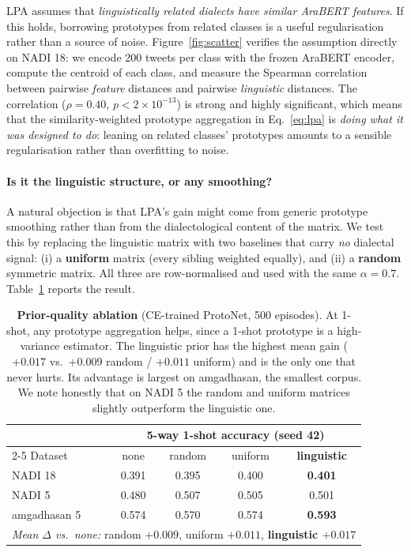 \documentclass[11pt,a4paper,twocolumn]{article}
\begin{document}
LPA assumes that \emph{linguistically related dialects have
similar AraBERT features}. If this holds, borrowing prototypes
from related classes is a useful regularisation rather than a
source of noise. Figure~\ref{fig:scatter} verifies the
assumption directly on NADI 18: we encode 200 tweets per class
with the frozen AraBERT encoder, compute the centroid of each
class, and measure the Spearman correlation between pairwise
\emph{feature} distances and pairwise \emph{linguistic}
distances. The correlation ($\rho{=}0.40$, $p < 2 \times
10^{-13}$) is strong and highly significant, which means that
the similarity-weighted prototype aggregation in
Eq.~\ref{eq:lpa} is \emph{doing what it was designed to do}:
leaning on related classes' prototypes amounts to a sensible
regularisation rather than overfitting to noise.

\paragraph{Is it the linguistic structure, or any smoothing?}
A natural objection is that LPA's gain might come from generic
prototype smoothing rather than from the dialectological
content of the matrix. We test this by replacing the linguistic
matrix with two baselines that carry \emph{no} dialectal
signal: (i) a \textbf{uniform} matrix (every sibling weighted
equally), and (ii) a \textbf{random} symmetric matrix. All
three are row-normalised and used with the same $\alpha{=}0.7$.
Table~\ref{tab:prior} reports the result.

\begin{table}[t]
\centering\small
\begin{tabular}{lcccc}
\toprule
& \multicolumn{4}{c}{5-way 1-shot accuracy (seed 42)} \\
\cmidrule(lr){2-5}
Dataset & none & random & uniform & \textbf{linguistic} \\
\midrule
NADI 18        & 0.391 & 0.395 & 0.400 & \textbf{0.401} \\
NADI 5         & 0.480 & 0.507 & 0.505 & 0.501 \\
amgadhasan 5   & 0.574 & 0.570 & 0.574 & \textbf{0.593} \\
\midrule
\multicolumn{5}{l}{\emph{Mean $\Delta$ vs.\ none:} random $+0.009$,
uniform $+0.011$, \textbf{linguistic $+0.017$}} \\
\bottomrule
\end{tabular}
\caption{\textbf{Prior-quality ablation} (CE-trained ProtoNet,
500 episodes). At 1-shot, any prototype aggregation helps,
since a 1-shot prototype is a high-variance estimator. The
linguistic prior has the highest mean gain ($+0.017$ vs.\
$+0.009$ random / $+0.011$ uniform) and is the only one that
never hurts. Its advantage is largest on amgadhasan, the
smallest corpus. We note honestly that on NADI 5 the random
and uniform matrices slightly outperform the linguistic one.}
\label{tab:prior}
\end{table}
\end{document}
